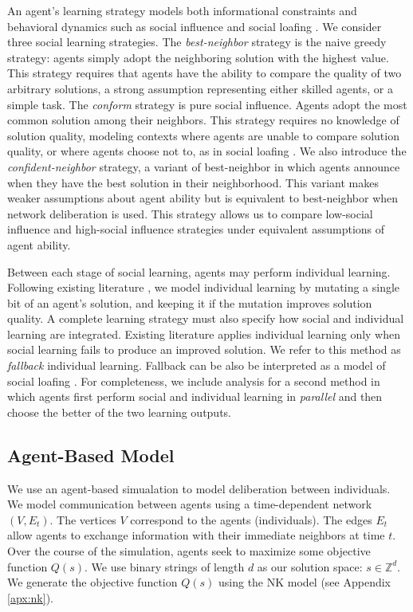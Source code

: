 An agent's learning strategy models both informational constraints and behavioral dynamics \cite{lazer_network_2007, barkoczi_social_2016} such as social influence and social loafing \cite{karau_social_1993}.
We consider three social learning strategies.
The {\em best-neighbor} strategy is the naive greedy strategy: agents simply adopt the neighboring solution with the highest value. This strategy requires that agents have the ability to compare the quality of two arbitrary solutions, a strong assumption representing either skilled agents, or a simple task.
The {\em conform} strategy is pure social influence. Agents adopt the most common solution among their neighbors.
This strategy requires no knowledge of solution quality, modeling contexts where agents are unable to compare solution quality, or where agents choose not to, as in social loafing \cite{karau_social_1993}.
We also introduce the {\em confident-neighbor} strategy, a variant of best-neighbor in which agents announce when they have the best solution in their neighborhood. This variant makes weaker assumptions about agent ability but is equivalent to best-neighbor when network deliberation is used.
This strategy allows us to compare low-social influence and high-social influence strategies under equivalent assumptions of agent ability.

Between each stage of social learning, agents may perform individual learning. Following existing literature \cite{lazer_network_2007, barkoczi_social_2016}, we model individual learning by mutating a single bit of an agent's solution, and keeping it if the mutation improves solution quality.
A complete learning strategy must also specify how social and individual learning are integrated. Existing literature \cite{lazer_network_2007, barkoczi_social_2016} applies individual learning only when social learning fails to produce an improved solution. We refer to this method as {\em fallback} individual learning. Fallback can be also be interpreted as a model of social loafing \cite{karau_social_1993}. For completeness, we include analysis for a second method in which agents first perform social and individual learning in {\em parallel} and then choose the better of the two learning outputs.

\subsection{Agent-Based Model}

We use an agent-based simualation to model deliberation between individuals.
We model communication between agents using a time-dependent network $(V,E_t)$.
The vertices $V$ correspond to the agents (individuals).
The edges $E_t$ allow agents to exchange information with their immediate neighbors at time $t$.
Over the course of the simulation, agents seek to maximize some objective function $Q(s)$.
We use binary strings of length $d$ as our solution space: $s \in \mathbb{Z}^d$.
We generate the objective function $Q(s)$ using the NK model \cite{kauffman_towards_1987, weinberger_local_1991} (see Appendix \ref{apx:nk}).

